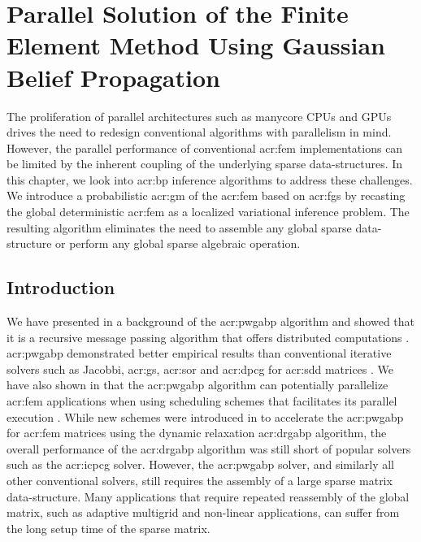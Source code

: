 \graphicspath{{figs/Chp-FGaBP/}}



\chapter{Parallel Solution of the Finite Element Method Using Gaussian Belief Propagation}
\label{chp:FGaBP}

The proliferation of parallel architectures such as manycore CPUs and GPUs drives the need to redesign conventional algorithms with parallelism in mind.
However, the parallel performance of conventional \gls{acr:fem} implementations can be limited by the inherent coupling of the underlying sparse data-structures.
In this chapter, we look into \gls{acr:bp} inference algorithms to address these challenges.
We introduce a probabilistic \gls{acr:gm} of the \gls{acr:fem} based on \glspl{acr:fg} by recasting the global deterministic \gls{acr:fem} as a localized variational inference problem.
The resulting algorithm eliminates the need to assemble any global sparse data-structure or perform any global sparse algebraic operation.


\section{Introduction}
\label{sec:gabpIntro}
We have presented in  a background of the \gls{acr:pwgabp} algorithm and showed that it is a recursive message passing algorithm that offers distributed computations \cite{bib:Pearl88ProbabilisticReasoning, bib:Weiss01CorrectnessBelief, bib:Shental2008GBPSSLE}.
\gls{acr:pwgabp} demonstrated better empirical results than conventional iterative solvers such as Jacobbi, \gls{acr:gs}, \gls{acr:sor} and \gls{acr:dpcg} for \gls{acr:sdd} matrices \cite{bib:El-Kurdi2012EIOGBPSFLSDDLS, bib:Shental2008GBPSSLE, bib:El-Kurdi2012RGBP}.
We have also shown in  that the \gls{acr:pwgabp} algorithm can potentially parallelize \gls{acr:fem} applications when using scheduling schemes that facilitates its parallel execution \cite{bib:El-Kurdi2012RGBP}.
While new schemes were introduced in  to accelerate the \gls{acr:pwgabp} for \gls{acr:fem} matrices using the dynamic relaxation \gls{acr:drgabp} algorithm, the overall performance of the \gls{acr:drgabp} algorithm was still short of popular solvers such as the \gls{acr:icpcg} solver.
However, the \gls{acr:pwgabp} solver, and similarly all other conventional solvers, still requires the assembly of a large sparse matrix data-structure.
Many applications that require repeated reassembly of the global matrix, such as adaptive multigrid and non-linear applications, can suffer from the long setup time of the sparse matrix.


